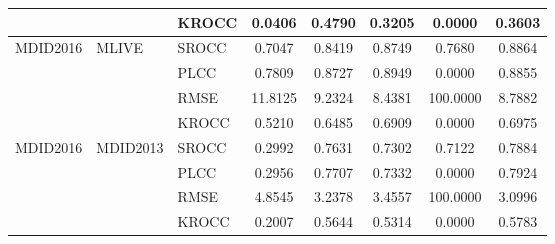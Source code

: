 \documentclass{article}
\begin{document}
\begin{table}
\begin{tabular}{||l|l|l||ccccc||}
\cmidrule{3-8}
&&KROCC&0.0406&0.4790&0.3205&0.0000&0.3603\\
\midrule
\multirow{4}{*}{MDID2016}&\multirow{4}{*}{MLIVE}&SROCC&0.7047&0.8419&0.8749&0.7680&0.8864\\
\cmidrule{3-8}
&&PLCC&0.7809&0.8727&0.8949&0.0000&0.8855\\
\cmidrule{3-8}
&&RMSE&11.8125&9.2324&8.4381&100.0000&8.7882\\
\cmidrule{3-8}
&&KROCC&0.5210&0.6485&0.6909&0.0000&0.6975\\
\midrule
\multirow{4}{*}{MDID2016}&\multirow{4}{*}{MDID2013}&SROCC&0.2992&0.7631&0.7302&0.7122&0.7884\\
\cmidrule{3-8}
&&PLCC&0.2956&0.7707&0.7332&0.0000&0.7924\\
\cmidrule{3-8}
&&RMSE&4.8545&3.2378&3.4557&100.0000&3.0996\\
\cmidrule{3-8}
&&KROCC&0.2007&0.5644&0.5314&0.0000&0.5783\\
\midrule
\end{tabular}
\end{table}
\end{document}
